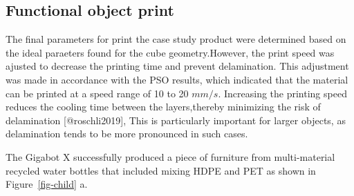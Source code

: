 \documentclass[
  letterpaper,
  DIV=11,
  numbers=noendperiod]{scrartcl}
\begin{document}
\hypertarget{functional-object-print}{%
\subsection{Functional object print}\label{functional-object-print}}

The final parameters for print the case study product were determined
based on the ideal paraeters found for the cube geometry.However, the
print speed was ajusted to decrease the printing time and prevent
delamination. This adjustment was made in accordance with the PSO
results, which indicated that the material can be printed at a speed
range of 10 to 20 \(mm/s\). Increasing the printing speed reduces the
cooling time between the layers,thereby minimizing the risk of
delamination {[}@roschli2019{]}, This is particularly important for
larger objects, as delamination tends to be more pronounced in such
cases.

The Gigabot X successfully produced a piece of furniture from
multi-material recycled water bottles that included mixing HDPE and PET
as shown in Figure~\ref{fig-child} a.
\end{document}
